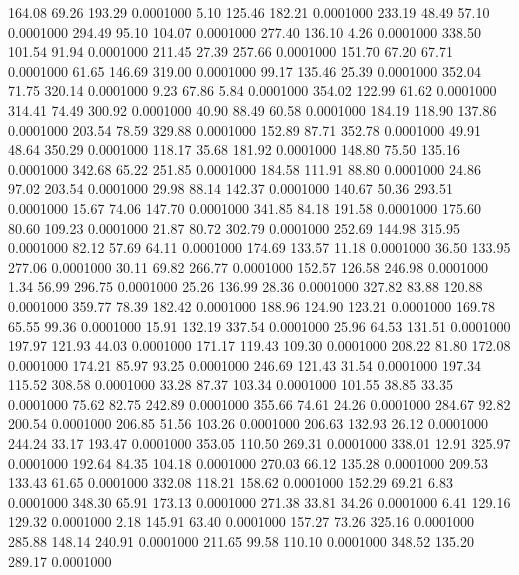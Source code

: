  164.08   69.26  193.29   0.0001000
   5.10  125.46  182.21   0.0001000
 233.19   48.49   57.10   0.0001000
 294.49   95.10  104.07   0.0001000
 277.40  136.10    4.26   0.0001000
 338.50  101.54   91.94   0.0001000
 211.45   27.39  257.66   0.0001000
 151.70   67.20   67.71   0.0001000
  61.65  146.69  319.00   0.0001000
  99.17  135.46   25.39   0.0001000
 352.04   71.75  320.14   0.0001000
   9.23   67.86    5.84   0.0001000
 354.02  122.99   61.62   0.0001000
 314.41   74.49  300.92   0.0001000
  40.90   88.49   60.58   0.0001000
 184.19  118.90  137.86   0.0001000
 203.54   78.59  329.88   0.0001000
 152.89   87.71  352.78   0.0001000
  49.91   48.64  350.29   0.0001000
 118.17   35.68  181.92   0.0001000
 148.80   75.50  135.16   0.0001000
 342.68   65.22  251.85   0.0001000
 184.58  111.91   88.80   0.0001000
  24.86   97.02  203.54   0.0001000
  29.98   88.14  142.37   0.0001000
 140.67   50.36  293.51   0.0001000
  15.67   74.06  147.70   0.0001000
 341.85   84.18  191.58   0.0001000
 175.60   80.60  109.23   0.0001000
  21.87   80.72  302.79   0.0001000
 252.69  144.98  315.95   0.0001000
  82.12   57.69   64.11   0.0001000
 174.69  133.57   11.18   0.0001000
  36.50  133.95  277.06   0.0001000
  30.11   69.82  266.77   0.0001000
 152.57  126.58  246.98   0.0001000
   1.34   56.99  296.75   0.0001000
  25.26  136.99   28.36   0.0001000
 327.82   83.88  120.88   0.0001000
 359.77   78.39  182.42   0.0001000
 188.96  124.90  123.21   0.0001000
 169.78   65.55   99.36   0.0001000
  15.91  132.19  337.54   0.0001000
  25.96   64.53  131.51   0.0001000
 197.97  121.93   44.03   0.0001000
 171.17  119.43  109.30   0.0001000
 208.22   81.80  172.08   0.0001000
 174.21   85.97   93.25   0.0001000
 246.69  121.43   31.54   0.0001000
 197.34  115.52  308.58   0.0001000
  33.28   87.37  103.34   0.0001000
 101.55   38.85   33.35   0.0001000
  75.62   82.75  242.89   0.0001000
 355.66   74.61   24.26   0.0001000
 284.67   92.82  200.54   0.0001000
 206.85   51.56  103.26   0.0001000
 206.63  132.93   26.12   0.0001000
 244.24   33.17  193.47   0.0001000
 353.05  110.50  269.31   0.0001000
 338.01   12.91  325.97   0.0001000
 192.64   84.35  104.18   0.0001000
 270.03   66.12  135.28   0.0001000
 209.53  133.43   61.65   0.0001000
 332.08  118.21  158.62   0.0001000
 152.29   69.21    6.83   0.0001000
 348.30   65.91  173.13   0.0001000
 271.38   33.81   34.26   0.0001000
   6.41  129.16  129.32   0.0001000
   2.18  145.91   63.40   0.0001000
 157.27   73.26  325.16   0.0001000
 285.88  148.14  240.91   0.0001000
 211.65   99.58  110.10   0.0001000
 348.52  135.20  289.17   0.0001000
